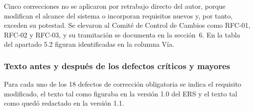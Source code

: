 \documentclass[journal,onecolumn]{IEEEtran}
\begin{document}
	Cinco correcciones no se aplicaron por retrabajo directo del autor, porque
	modifican el alcance del sistema o incorporan requisitos nuevos y, por
	tanto, exceden su potestad. Se elevaron al Comité de Control de Cambios como
	RFC-01, RFC-02 y RFC-03, y su tramitación se documenta en la sección~6. En
	la tabla del apartado 5.2 figuran identificadas en la columna Vía.
	
	\subsubsection{Texto antes y después de los defectos críticos y mayores}
	
	Para cada uno de los 18 defectos de corrección obligatoria se indica el
	requisito modificado, el texto tal como figuraba en la versión 1.0 del ERS y
	el texto tal como quedó redactado en la versión 1.1.
	
\end{document}
